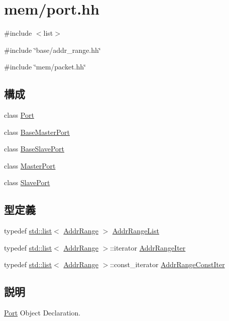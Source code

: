 \hypertarget{port_8hh}{
\section{mem/port.hh}
\label{port_8hh}
}
{\ttfamily \#include $<$list$>$}\par
{\ttfamily \#include \char`\"{}base/addr\_\-range.hh\char`\"{}}\par
{\ttfamily \#include \char`\"{}mem/packet.hh\char`\"{}}\par
\subsection*{構成}
\begin{DoxyCompactItemize}
\item 
class \hyperlink{classPort}{Port}
\item 
class \hyperlink{classBaseMasterPort}{BaseMasterPort}
\item 
class \hyperlink{classBaseSlavePort}{BaseSlavePort}
\item 
class \hyperlink{classMasterPort}{MasterPort}
\item 
class \hyperlink{classSlavePort}{SlavePort}
\end{DoxyCompactItemize}
\subsection*{型定義}
\begin{DoxyCompactItemize}
\item 
typedef \hyperlink{classstd_1_1list}{std::list}$<$ \hyperlink{classAddrRange}{AddrRange} $>$ \hyperlink{port_8hh_a8f73751754cd29dbff43400e751325c0}{AddrRangeList}
\item 
typedef \hyperlink{classstd_1_1list}{std::list}$<$ \hyperlink{classAddrRange}{AddrRange} $>$::iterator \hyperlink{port_8hh_a5f27b286a946c7b1f93f37faecf43476}{AddrRangeIter}
\item 
typedef \hyperlink{classstd_1_1list}{std::list}$<$ \hyperlink{classAddrRange}{AddrRange} $>$::const\_\-iterator \hyperlink{port_8hh_a0f4385f0a7bf93ed2e39e1a630b291b0}{AddrRangeConstIter}
\end{DoxyCompactItemize}


\subsection{説明}
\hyperlink{classPort}{Port} Object Declaration. 

